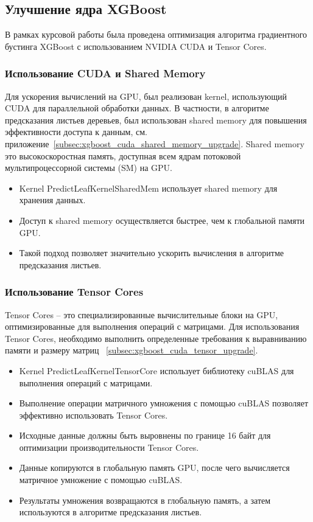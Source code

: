 \documentclass[14pt, a4paper]{extreport}
\begin{document}
    \subsection{Улучшение ядра XGBoost}

    В рамках курсовой работы была проведена оптимизация алгоритма градиентного бустинга XGBoost с использованием NVIDIA CUDA и Tensor Cores.

    \subsubsection{Использование CUDA и Shared Memory}

    Для ускорения вычислений на GPU, был реализован kernel, использующий CUDA для параллельной обработки данных.
    В частности, в алгоритме предсказания листьев деревьев, был использован shared memory для повышения эффективности доступа к данным, см. приложение~\ref{subsec:xgboost_cuda_shared_memory_upgrade}.
    Shared memory \textemdash{} это высокоскоростная память, доступная всем ядрам потоковой мультипроцессорной системы (SM) на GPU\@.

    \begin{itemize}
        \item Kernel PredictLeafKernelSharedMem использует shared memory для хранения данных\@.
        \item Доступ к shared memory осуществляется быстрее, чем к глобальной памяти GPU\@.
        \item Такой подход позволяет значительно ускорить вычисления в алгоритме предсказания листьев\@.
    \end{itemize}

    \subsubsection{Использование Tensor Cores}

    Tensor Cores – это специализированные вычислительные блоки на GPU, оптимизированные для выполнения операций с матрицами.
    Для использования Tensor Cores, необходимо выполнить определенные требования к выравниванию памяти и размеру матриц ~\ref{subsec:xgboost_cuda_tensor_upgrade}.
    \begin{itemize}
        \item Kernel PredictLeafKernelTensorCore использует библиотеку cuBLAS для выполнения операций с матрицами.
        \item Выполнение операции матричного умножения с помощью cuBLAS позволяет эффективно использовать Tensor Cores.
        \item Исходные данные должны быть выровнены по границе 16 байт для оптимизации производительности Tensor Cores.
        \item Данные копируются в глобальную память GPU, после чего вычисляется матричное умножение с помощью cuBLAS\@.
        \item Результаты умножения возвращаются в глобальную память, а затем используются в алгоритме предсказания листьев.
    \end{itemize}
\end{document}
